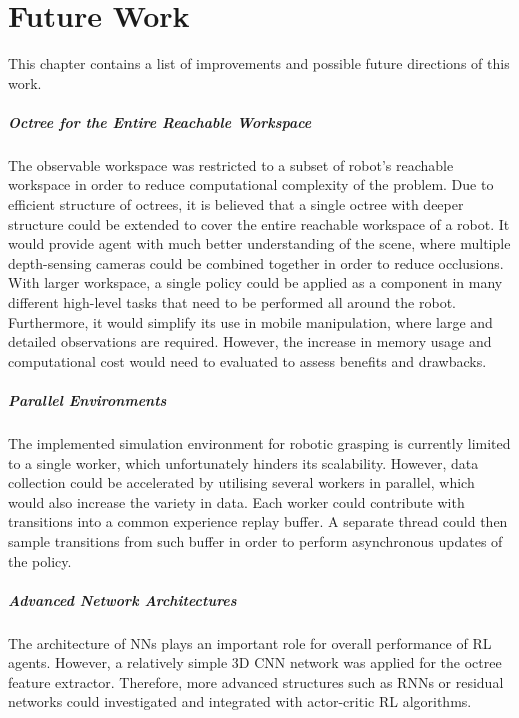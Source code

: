 \chapter{Future Work}\label{ch:future_work}

This chapter contains a list of improvements and possible future directions of this work.

\paragraph{Octree for the Entire Reachable Workspace} The observable workspace was restricted to a subset of robot's reachable workspace in order to reduce computational complexity of the problem. Due to efficient structure of octrees, it is believed that a single octree with deeper structure could be extended to cover the entire reachable workspace of a robot. It would provide agent with much better understanding of the scene, where multiple depth-sensing cameras could be combined together in order to reduce occlusions. With larger workspace, a single policy could be applied as a component in many different high-level tasks that need to be performed all around the robot. Furthermore, it would simplify its use in mobile manipulation, where large and detailed observations are required. However, the increase in memory usage and computational cost would need to evaluated to assess benefits and drawbacks.

\paragraph{Parallel Environments} The implemented simulation environment for robotic grasping is currently limited to a single worker, which unfortunately hinders its scalability. However, data collection could be accelerated by utilising several workers in parallel, which would also increase the variety in data. Each worker could contribute with transitions into a common experience replay buffer. A separate thread could then sample transitions from such buffer in order to perform asynchronous updates of the policy.

\paragraph{Advanced Network Architectures} The architecture of NNs plays an important role for overall performance of RL agents. However, a relatively simple 3D CNN network was applied for the octree feature extractor. Therefore, more advanced structures such as RNNs or residual networks could investigated and integrated with actor-critic RL algorithms.


